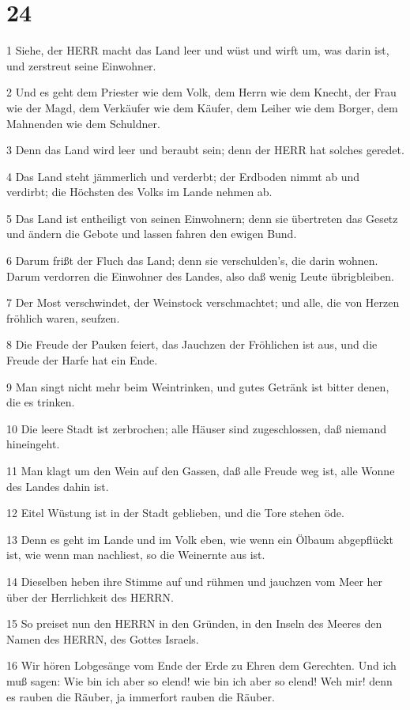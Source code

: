 \chapter{24}

\par 1 Siehe, der HERR macht das Land leer und wüst und wirft um, was darin ist, und zerstreut seine Einwohner.
\par 2 Und es geht dem Priester wie dem Volk, dem Herrn wie dem Knecht, der Frau wie der Magd, dem Verkäufer wie dem Käufer, dem Leiher wie dem Borger, dem Mahnenden wie dem Schuldner.
\par 3 Denn das Land wird leer und beraubt sein; denn der HERR hat solches geredet.
\par 4 Das Land steht jämmerlich und verderbt; der Erdboden nimmt ab und verdirbt; die Höchsten des Volks im Lande nehmen ab.
\par 5 Das Land ist entheiligt von seinen Einwohnern; denn sie übertreten das Gesetz und ändern die Gebote und lassen fahren den ewigen Bund.
\par 6 Darum frißt der Fluch das Land; denn sie verschulden's, die darin wohnen. Darum verdorren die Einwohner des Landes, also daß wenig Leute übrigbleiben.
\par 7 Der Most verschwindet, der Weinstock verschmachtet; und alle, die von Herzen fröhlich waren, seufzen.
\par 8 Die Freude der Pauken feiert, das Jauchzen der Fröhlichen ist aus, und die Freude der Harfe hat ein Ende.
\par 9 Man singt nicht mehr beim Weintrinken, und gutes Getränk ist bitter denen, die es trinken.
\par 10 Die leere Stadt ist zerbrochen; alle Häuser sind zugeschlossen, daß niemand hineingeht.
\par 11 Man klagt um den Wein auf den Gassen, daß alle Freude weg ist, alle Wonne des Landes dahin ist.
\par 12 Eitel Wüstung ist in der Stadt geblieben, und die Tore stehen öde.
\par 13 Denn es geht im Lande und im Volk eben, wie wenn ein Ölbaum abgepflückt ist, wie wenn man nachliest, so die Weinernte aus ist.
\par 14 Dieselben heben ihre Stimme auf und rühmen und jauchzen vom Meer her über der Herrlichkeit des HERRN.
\par 15 So preiset nun den HERRN in den Gründen, in den Inseln des Meeres den Namen des HERRN, des Gottes Israels.
\par 16 Wir hören Lobgesänge vom Ende der Erde zu Ehren dem Gerechten. Und ich muß sagen: Wie bin ich aber so elend! wie bin ich aber so elend! Weh mir! denn es rauben die Räuber, ja immerfort rauben die Räuber.
